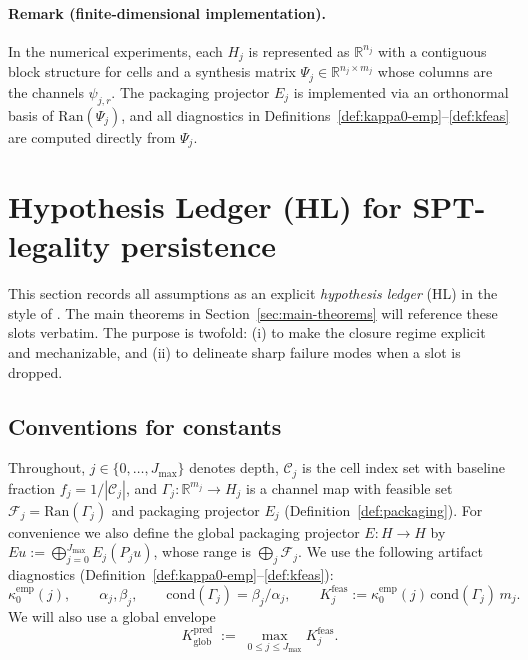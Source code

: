 \documentclass[11pt]{article}
\newcommand{\Ran}{\mathrm{Ran}}
\begin{document}
\paragraph{Remark (finite-dimensional implementation).}
In the numerical experiments, each $H_j$ is represented as $\mathbb{R}^{n_j}$ with a contiguous block structure for cells and a synthesis matrix $\Psi_j\in\mathbb{R}^{n_j\times m_j}$ whose columns are the channels $\psi_{j,r}$.
The packaging projector $E_j$ is implemented via an orthonormal basis of $\Ran(\Psi_j)$, and all diagnostics in Definitions~\ref{def:kappa0-emp}--\ref{def:kfeas} are computed directly from $\Psi_j$.
 \section{Hypothesis Ledger (HL) for SPT-legality persistence}\label{sec:hypotheses}

This section records all assumptions as an explicit \emph{hypothesis ledger} (HL) in the style of \cite{Tsiokos2026SixBirds}.
The main theorems in Section~\ref{sec:main-theorems} will reference these slots verbatim.
The purpose is twofold:
(i) to make the closure regime explicit and mechanizable, and
(ii) to delineate sharp failure modes when a slot is dropped.

\subsection{Conventions for constants}

Throughout, $j\in\{0,\dots,J_{\max}\}$ denotes depth, $\mathcal{C}_j$ is the cell index set with baseline fraction $f_j=1/|\mathcal{C}_j|$, and $\Gamma_j:\mathbb{R}^{m_j}\to H_j$ is a channel map with feasible set $\mathcal{F}_j=\Ran(\Gamma_j)$ and packaging projector $E_j$ (Definition~\ref{def:packaging}).
For convenience we also define the global packaging projector $E:H\to H$ by
$Eu := \bigoplus_{j=0}^{J_{\max}} E_j(P_j u)$, whose range is $\bigoplus_j \mathcal{F}_j$.
We use the following artifact diagnostics (Definition~\ref{def:kappa0-emp}--\ref{def:kfeas}):
\[
\kappa^{\mathrm{emp}}_0(j),\qquad
\alpha_j,\beta_j,\qquad
\mathrm{cond}(\Gamma_j)=\beta_j/\alpha_j,\qquad
K^{\mathrm{feas}}_j := \kappa^{\mathrm{emp}}_0(j)\,\mathrm{cond}(\Gamma_j)\,m_j.
\]
We will also use a global envelope
\begin{equation}\label{eq:Kpred-global}
K^{\mathrm{pred}}_{\mathrm{glob}}
\;:=\;
\max_{0\le j\le J_{\max}} K^{\mathrm{feas}}_j.
\end{equation}
\end{document}
